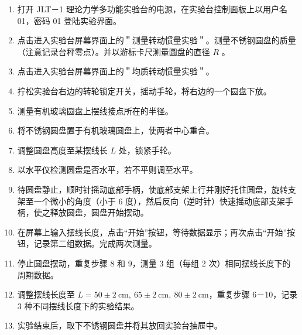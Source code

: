 \documentclass{article}
\begin{document}
\begin{enumerate}
    \item 打开 JLT－1 理论力学多功能实验台的电源，在实验台控制面板上以用户名 01，密码 01 登陆实验界面。
    \item 点击进入实验台屏幕界面上的＂测量转动惯量实验＂。测量不锈钢圆盘的质量（注意记录台秤零点）。并以游标卡尺测量圆盘的直径 $R$ 。
    \item 点击进入实验台屏幕界面上的＂均质转动惯量实验＂。
    \item 拧松实验台右边的转轮锁定开关，摇动手轮，将右边的一个圆盘下放。
    \item 测量有机玻璃圆盘上摆线接点所在的半径。
    \item 将不锈钢圆盘置于有机玻璃圆盘上，使两者中心重合。
    \item 调整圆盘高度至某摆线长 $L$ 处，锁紧手轮。
    \item 以水平仪检测圆盘是否水平，若不平则调至水平。
    \item 待圆盘静止，顺时针摇动底部手柄，使底部支架上行并刚好托住圆盘，旋转支架至一个微小的角度（小于 6 度），然后反向（逆时针）快速摇动底部支架手柄，使之释放圆盘，圆盘开始摆动。
    \item 在屏幕上输入摆线长度，点击“开始”按钮，等待数据显示；再次点击“开始”按钮，记录第二组数据。完成两次测量。
    \item 停止圆盘摆动，重复步骤 8 和 9，测量 3 组（每组 2 次）相同摆线长度下的周期数据。
    \item 调整摆线长度至 $L=50 \pm 2 \mathrm{~cm}, ~ 65 \pm 2 \mathrm{~cm}, ~ 80 \pm 2 \mathrm{~cm}$，重复步骤 6－10，记录 3 种不同摆线长度下的实验结果。
    \item 实验结束后，取下不锈钢圆盘并将其放回实验台抽屉中。
\end{enumerate}
\end{document}
